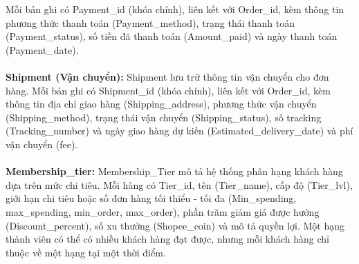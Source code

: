 Mỗi bản ghi có Payment\_id (khóa chính), liên kết với Order\_id, 
kèm thông tin phương thức thanh toán (Payment\_method), trạng thái thanh toán (Payment\_status), 
số tiền đã thanh toán (Amount\_paid) và ngày thanh toán (Payment\_date). \\ \\
\hspace*{2em} \textbf{Shipment (Vận chuyển):} Shipment lưu trữ thông tin vận chuyển cho đơn hàng. 
Mỗi bản ghi có Shipment\_id (khóa chính), liên kết với Order\_id, kèm thông tin địa chỉ giao hàng (Shipping\_address), 
phương thức vận chuyển (Shipping\_method), trạng thái vận chuyển (Shipping\_status), số tracking (Tracking\_number) và 
ngày giao hàng dự kiến (Estimated\_delivery\_date) và phí vận chuyển (fee). \\ \\
\hspace*{2em} \textbf{Membership\_tier:} Membership\_Tier mô tả hệ thống phân hạng khách hàng dựa trên mức chi tiêu. 
Mỗi hàng có Tier\_id, tên (Tier\_name), cấp độ (Tier\_lvl), 
giới hạn chi tiêu hoặc số đơn hàng tối thiểu - tối đa (Min\_spending, max\_spending, min\_order, max\_order), 
phần trăm giảm giá được hưởng (Discount\_percent), số xu thưởng (Shopee\_coin) và mô tả quyền lợi. 
Một hạng thành viên có thể có nhiều khách hàng đạt được, nhưng mỗi khách hàng chỉ thuộc về một hạng tại một thời điểm. \\


